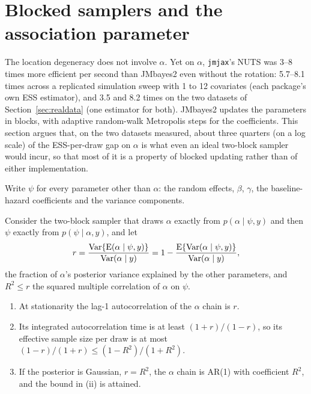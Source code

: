 \section{Blocked samplers and the association parameter}\label{sec:blocked}

The location degeneracy does not involve $\alpha$. Yet on $\alpha$,
\texttt{jmjax}'s NUTS was 3--8 times more efficient per second than
JMbayes2 even without the rotation: 5.7--8.1 times across a replicated
simulation sweep with 1 to 12 covariates (each package's own ESS
estimator), and 3.5 and 8.2 times on the two datasets of
Section~\ref{sec:realdata} (one estimator for both). JMbayes2 updates the parameters in
blocks, with adaptive random-walk Metropolis steps for the coefficients.
This section argues that, on the two datasets measured, about three quarters (on a log scale) of the ESS-per-draw gap on $\alpha$ is what even an ideal two-block sampler would incur, so that most of it is a property of blocked updating rather than of either implementation.

Write $\psi$ for every parameter other than $\alpha$: the random effects,
$\beta$, $\gamma$, the baseline-hazard coefficients and the variance
components.

\begin{proposition}\label{prop:blocked}
Consider the two-block sampler that draws $\alpha$ exactly from
$p(\alpha \mid \psi, y)$ and then $\psi$ exactly from $p(\psi \mid
\alpha, y)$, and let
\[
r = \frac{\operatorname{Var}\{\mathrm{E}(\alpha \mid \psi, y)\}}{\operatorname{Var}(\alpha \mid y)}
= 1 - \frac{\mathrm{E}\{\operatorname{Var}(\alpha \mid \psi, y)\}}{\operatorname{Var}(\alpha \mid y)},
\]
the fraction of $\alpha$'s posterior variance explained by the other
parameters, and $R^2 \leq r$ the squared multiple correlation of $\alpha$
on $\psi$.
\begin{enumerate}
\item[(i)] At stationarity the lag-1 autocorrelation of the $\alpha$ chain
is $r$.
\item[(ii)] Its integrated autocorrelation time is at least $(1 + r)/(1 -
r)$, so its effective sample size per draw is at most $(1 - r)/(1 + r)
\leq (1 - R^2)/(1 + R^2)$.
\item[(iii)] If the posterior is Gaussian, $r = R^2$, the $\alpha$ chain
is AR(1) with coefficient $R^2$, and the bound in (ii) is attained.
\end{enumerate}
\end{proposition}

